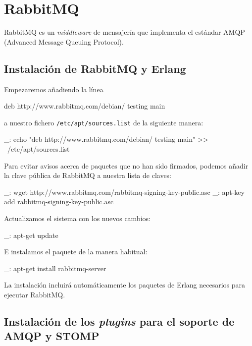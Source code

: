 \chapter{RabbitMQ}
\label{comun:rabbitmq}

RabbitMQ es un \emph{middleware} de mensajería que implementa el estándar AMQP (Advanced Message Queuing Protocol).


\section{Instalación de RabbitMQ y Erlang}

Empezaremos añadiendo la línea

\begin{bashcode}
deb http://www.rabbitmq.com/debian/ testing main
\end{bashcode}

a nuestro fichero \texttt{/etc/apt/sources.list} de la siguiente manera:

\begin{bashcode}
_: echo "deb http://www.rabbitmq.com/debian/ testing main" >> \
/etc/apt/sources.list
\end{bashcode}

Para evitar avisos acerca de paquetes que no han sido firmados, podemos añadir la clave pública de RabbitMQ a nuestra lista de claves:

\begin{bashcode}
_: wget http://www.rabbitmq.com/rabbitmq-signing-key-public.asc
_: apt-key add rabbitmq-signing-key-public.asc
\end{bashcode}

Actualizamos el sistema con los nuevos cambios:

\begin{bashcode}
_: apt-get update
\end{bashcode}

E instalamos el paquete de la manera habitual:

\begin{bashcode}
_: apt-get install rabbitmq-server
\end{bashcode}

La instalación incluirá automáticamente los paquetes de Erlang necesarios para ejecutar RabbitMQ.


\section{Instalación de los \emph{plugins} para el soporte de AMQP y STOMP}

